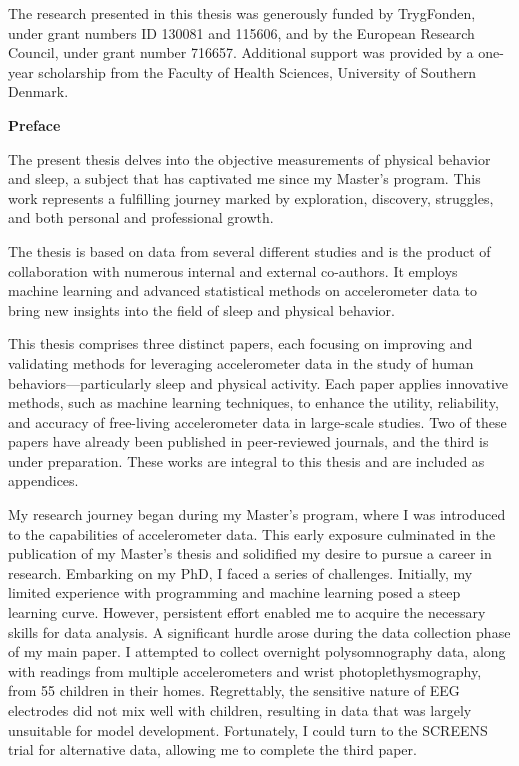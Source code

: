 \documentclass[
  10pt,
]{scrbook}
\let\originaltextbf\textbf
\renewcommand{\textbf}[1]{\textcolor{color1}{\originaltextbf{#1}}}
\begin{document}
The research presented in this thesis was generously funded by TrygFonden, under grant numbers ID 130081 and 115606, and by the European Research Council, under grant number 716657. Additional support was provided by a one-year scholarship from the Faculty of Health Sciences, University of Southern Denmark.

\newpage

  
\textcolor{color1}{\textsf{\textbf{\Large{Preface}}}}

\vspace*{\baselineskip}

The present thesis delves into the objective measurements of physical behavior and sleep, a subject that has captivated me since my Master's program. This work represents a fulfilling journey marked by exploration, discovery, struggles, and both personal and professional growth.

The thesis is based on data from several different studies and is the product of collaboration with numerous internal and external co-authors. It employs machine learning and advanced statistical methods on accelerometer data to bring new insights into the field of sleep and physical behavior.

This thesis comprises three distinct papers, each focusing on improving and validating methods for leveraging accelerometer data in the study of human behaviors—particularly sleep and physical activity. Each paper applies innovative methods, such as machine learning techniques, to enhance the utility, reliability, and accuracy of free-living accelerometer data in large-scale studies. Two of these papers have already been published in peer-reviewed journals, and the third is under preparation. These works are integral to this thesis and are included as appendices.

My research journey began during my Master's program, where I was introduced to the capabilities of accelerometer data. This early exposure culminated in the publication of my Master's thesis and solidified my desire to pursue a career in research. Embarking on my PhD, I faced a series of challenges. Initially, my limited experience with programming and machine learning posed a steep learning curve. However, persistent effort enabled me to acquire the necessary skills for data analysis. A significant hurdle arose during the data collection phase of my main paper. I attempted to collect overnight polysomnography data, along with readings from multiple accelerometers and wrist photoplethysmography, from 55 children in their homes. Regrettably, the sensitive nature of EEG electrodes did not mix well with children, resulting in data that was largely unsuitable for model development. Fortunately, I could turn to the SCREENS trial for alternative data, allowing me to complete the third paper.
\end{document}
